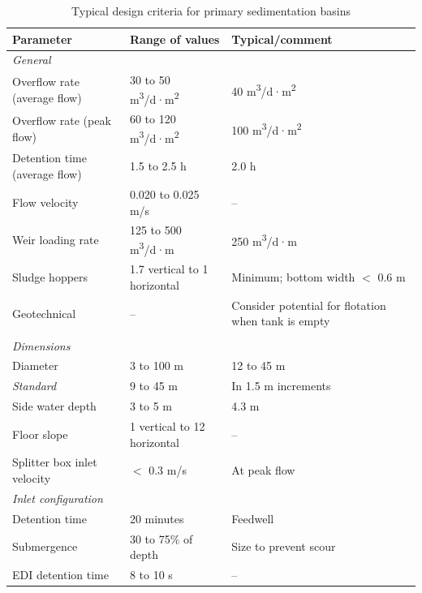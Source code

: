 \documentclass[11pt]{article}
\begin{document}
\begin{table}[h]
\caption{Typical design criteria for primary sedimentation basins \cite{davis2010water}}
\label{tab:primary_sed_basin_criteria}
\centering
\begin{tabularx}{\textwidth}{@{} l l l @{}}
\toprule
\textbf{Parameter} & \textbf{Range of values} & \textbf{Typical/comment} \\
\midrule
\multicolumn{3}{l}{\textit{General}} \\
Overflow rate (average flow) & 30 to 50 m\textsuperscript{3}/d·m\textsuperscript{2} & 40 m\textsuperscript{3}/d·m\textsuperscript{2} \\
Overflow rate (peak flow)    & 60 to 120 m\textsuperscript{3}/d·m\textsuperscript{2} & 100 m\textsuperscript{3}/d·m\textsuperscript{2} \\
Detention time (average flow) & 1.5 to 2.5 h & 2.0 h \\
Flow velocity & 0.020 to 0.025 m/s & -- \\
Weir loading rate & 125 to 500 m\textsuperscript{3}/d·m & 250 m\textsuperscript{3}/d·m \\
Sludge hoppers & 1.7 vertical to 1 horizontal & Minimum; bottom width $<$ 0.6 m \\
Geotechnical & -- & Consider potential for flotation when tank is empty \\
\addlinespace
\multicolumn{3}{l}{\textit{Circular tanks}} \\
\textit{Dimensions} & & \\
\quad Diameter & 3 to 100 m & 12 to 45 m \\
\quad \textit{Standard} & 9 to 45 m & In 1.5 m increments \\
\quad Side water depth & 3 to 5 m & 4.3 m \\
\quad Floor slope & 1 vertical to 12 horizontal & -- \\
\addlinespace
Splitter box inlet velocity & $<$ 0.3 m/s & At peak flow \\
\addlinespace
\textit{Inlet configuration} & & \\
\quad Detention time & 20 minutes & Feedwell \\
\quad Submergence & 30 to 75\% of depth & Size to prevent scour \\
\quad EDI detention time & 8 to 10 s & -- \\
\bottomrule
\end{tabularx}
\end{table}
\end{document}
